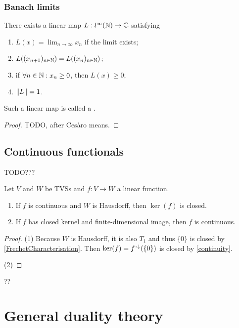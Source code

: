 \subsubsection{Banach limits}
\begin{proposition}
There exists a linear map $L:l^\infty(\mathbb{N}) \to \mathbb{C}$ satisfying
\begin{enumerate}
\item $\displaystyle L(x) = \lim_{n\to \infty}x_n$ if the limit exists;
\item $L((x_{n+1})_{n\in\mathbb{N}}) = L((x_n)_{n\in\mathbb{N}})$;
\item if $\forall n\in\mathbb{N}:x_n\geq 0$, then $L(x) \geq 0$;
\item $\lVert L\rVert = 1$.
\end{enumerate}
Such a linear map is called a .
\end{proposition}
\begin{proof}
TODO, after Cesàro means.
\end{proof}

\subsection{Continuous functionals}

TODO???
\begin{proposition}
Let $V$ and $W$ be TVSs and $f: V\to W$ a linear function.
\begin{enumerate}
\item If $f$ is continuous and $W$ is Hausdorff, then $\ker(f)$ is closed.
\item If $f$ has closed kernel and finite-dimensional image, then $f$ is continuous.
\end{enumerate}
\end{proposition}
\begin{proof}
(1) Because $W$ is Hausdorff, it is also $T_1$ and thus $\{0\}$ is closed by \ref{FrechetCharacterisation}. Then $\ker(f) = f^{{\text{\hspace{0.15em}-}\downarrow}}(\{0\})$ is closed by \ref{continuity}.

(2) 
\end{proof}
??



\section{General duality theory}
